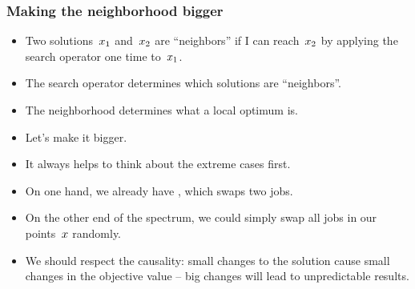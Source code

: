 \documentclass[mathserif]{beamer}%
\begin{document}
%
\begin{frame}%
\frametitle{Making the neighborhood bigger}%
\begin{itemize}%
\item Two solutions~$x_1$ and~$x_2$ are ``neighbors'' if I can reach~$x_2$ by applying the search operator one time to~$x_1$.%
\item<2-> The search operator determines which solutions are ``neighbors''.%
\item<3-> The neighborhood determines what a local optimum is.%
\item<4-> Let's make it bigger.%
\item<5-> It always helps to think about the extreme cases first.%
\item<6-> On one hand, we already have , which swaps two jobs.%
\item<8-> On the other end of the spectrum, we could simply swap all jobs in our points~$x$ randomly.%
\item<11-> We should respect the causality: small changes to the solution cause small changes in the objective value -- big changes will lead to unpredictable results.%
\end{itemize}%
\end{frame}%
%
\end{document}
